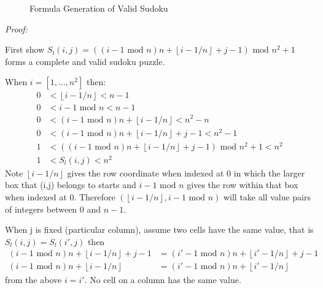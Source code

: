 \documentclass[a4paper,11pt]{report}
\newcounter{row}
\newcounter{col}
\newcounter{rowa}
\newcounter{cola}
\newcommand\setrow[9]{
\setcounter{col}{1}
\foreach \n in {#1, #2, #3, #4, #5, #6, #7, #8, #9} {
\edef\x{\value{col} - 0.5}
\edef\y{9.5 - \value{row}}
\node[anchor=center] at (\x, \y) {\n};
\stepcounter{col}
}
\stepcounter{row}
}
\newcommand\setrowa[4]{
\setcounter{cola}{1}
\foreach \n in {#1, #2, #3, #4} {
\edef\x{\value{cola} - 0.5}
\edef\y{4.5 - \value{rowa}}
\node[anchor=center] at (\x, \y) {\n};
\stepcounter{cola}
}
\stepcounter{rowa}
}
\begin{document}
\begin{figure}[h]
\centering
{}
\caption{Formula Generation of Valid Sudoku}
\label{formula}
\end{figure}

\textit{Proof:}

First show $S_l(i,j)=((i-1 \text{ mod } n)n + \left\lfloor{i-1/n}\right\rfloor+j-1)\text{ mod } n^2 +1$ forms a complete and valid sudoku puzzle.

When $i=[1,...,n^2]$ then:
\begin{align}
0&<\left\lfloor{i-1/n}\right\rfloor<n-1\\
0&<i-1 \text{ mod } n<n-1\\
0&<(i-1 \text{ mod } n)n + \left\lfloor{i-1/n}\right\rfloor<n^2-n\\
0&<(i-1 \text{ mod } n)n + \left\lfloor{i-1/n}\right\rfloor+j-1<n^2-1\\
1&<((i-1 \text{ mod } n)n + \left\lfloor{i-1/n}\right\rfloor+j-1)\text{ mod } n^2 +1<n^2\\
1&<S_l(i,j)<n^2
\end{align} 
Note $\left\lfloor{i-1/n}\right\rfloor$ gives the row coordinate when indexed at 0 in which the larger box that (i,j) belongs to starts and $i-1 \text{ mod } n$ gives the row within that box when indexed at 0. Therefore $(\left\lfloor{i-1/n}\right\rfloor,i-1 \text{ mod } n)$ will take all value pairs of integers between 0 and $n-1$.

When j is fixed (particular column), assume two cells have the same value, that is $S_l(i,j)=S_l(i',j)$ then
\begin{align}
(i-1 \text{ mod } n)n + \left\lfloor{i-1/n}\right\rfloor+j-1 &= (i'-1 \text{ mod } n)n +
\left\lfloor{i'-1/n}\right\rfloor+j-1\\
(i-1 \text{ mod } n)n + \left\lfloor{i-1/n}\right\rfloor &= (i'-1 \text{ mod } n)n + \left\lfloor{i'-1/n}\right\rfloor
\end{align}
from the above $i=i'$. No cell on a column has the same value.
\end{document}
